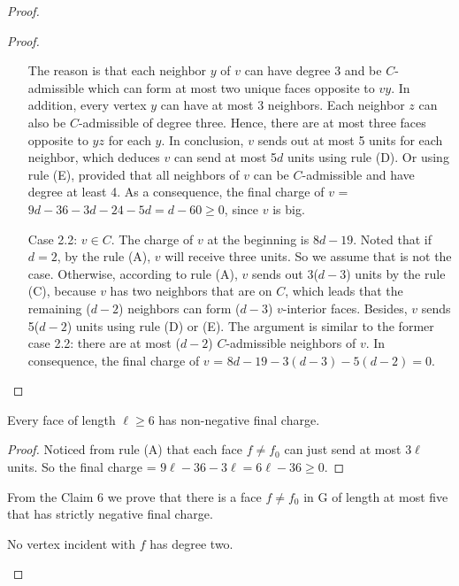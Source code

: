 \begin{proof}
\begin{proof}
\begin{itemize}
    The reason is that each neighbor $y$ of $v$ can have degree 3 and be $C$-admissible which can form at most two unique faces opposite to $vy$. In addition, every vertex $y$ can have at most 3 neighbors. Each neighbor $z$ can also be $C$-admissible of degree three. Hence, there are at most three faces opposite to $yz$ for each $y$. In conclusion, $v$ sends out at most 5 units for each neighbor, which deduces $v$ can send at most 5$d$ units using rule (D). Or using rule (E), provided that all neighbors of $v$ can be $C$-admissible and have degree at least 4. As a consequence, the final charge of $v$ = $9d -36 - 3d - 24 - 5d = d - 60 \geq 0$, since $v$ is big.
    \item[Case 2.2:] \textit{\textbf{$v \in C.$}} The charge of $v$ at the beginning is $8d - 19$. Noted that if $d = 2$, by the rule (A), $v$ will receive three units. So we assume that is not the case. Otherwise, according to rule (A), $v$ sends out 3($d-3$) units by the rule (C), because $v$ has two neighbors that are on $C$, which leads that the remaining ($d-2$) neighbors can form ($d - 3$) $v$-interior faces. Besides, $v$ sends 5($d - 2$) units using rule (D) or (E). The argument is similar to the former case 2.2: there are at most ($d-2$) $C$-admissible neighbors of $v$. In consequence, the final charge of $v$ = $8d - 19 - 3(d - 3) - 5(d - 2) = 0$.
\end{itemize}
\end{proof}

\begin{claim}
Every face of length $\ell \geq 6$ has non-negative final charge.
\end{claim}
\begin{proof}
Noticed from rule (A) that each face $f \ne f_0$ can just send at most 3$\ell$ units. So the final charge = $9\ell - 36 - 3\ell = 6\ell - 36 \geq 0$. 
\end{proof}
From the Claim 6 we prove that there is a face $f \ne f_0$ in G of length at most five that has strictly negative final charge.

\begin{corollary}
No vertex incident with $f$ has degree two.
\end{corollary}


\end{proof}
